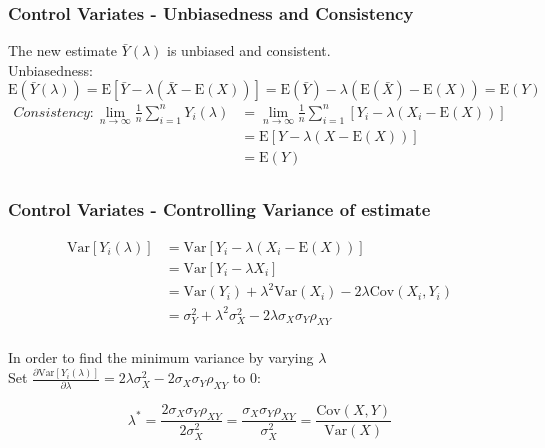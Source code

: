\documentclass{beamer}
\begin{document}
\begin{frame}
\frametitle{Control Variates - Unbiasedness and Consistency}
The new estimate $\bar{Y}(\lambda)$ is unbiased and consistent.\\[5mm]
Unbiasedness: $$\mathrm{E}(\bar{Y}(\lambda)) = \mathrm{E}[\bar{Y} - \lambda(\bar{X} - \mathrm{E}(X))] = \mathrm{E}(\bar{Y}) - \lambda(\mathrm{E}(\bar{X}) - \mathrm{E}(X)) = \mathrm{E}(Y) $$
\begin{equation*}
\begin{split}
Consistency: \lim_{n\to\infty} \frac{1}{n}\sum_{i=1}^{n} Y_{i}(\lambda) 
&=\lim_{n\to\infty} \frac{1}{n}\sum_{i=1}^{n} [Y_{i} - \lambda (X_{i} - \mathrm{E}(X))] \\
&= \mathrm{E}[Y - \lambda(X-\mathrm{E}(X))] \\
&= \mathrm{E}(Y) \\
\end{split}
\end{equation*}
\end{frame}

\begin{frame}
\frametitle{Control Variates - Controlling Variance of estimate}
\begin{equation*}
\begin{split}
\mathrm{Var}[Y_{i}(\lambda)]
&=\mathrm{Var} [Y_{i} - \lambda(X_{i} - \mathrm{E}(X))] \\
&= \mathrm{Var}[Y_{i} - \lambda X_{i}] \\
&= \mathrm{Var}(Y_{i}) + \lambda^{2}\mathrm{Var}(X_{i}) - 2\lambda\mathrm{Cov}(X_{i}, Y_{i}) \\
&= \sigma_{Y}^{2} + \lambda^{2}\sigma_{X}^{2}-2\lambda\sigma_{X}\sigma_{Y}\rho_{XY}\\
\end{split}
\end{equation*}
\begin{center}
In order to find the minimum variance by varying $\lambda$\\[2mm]
Set $\frac{\partial \mathrm{Var}[Y_{i}(\lambda)]}{\partial \lambda} = 2\lambda \sigma_{X}^{2} - 2\sigma_{X}\sigma_{Y}\rho_{XY}$ to 0:
\end{center}
$$ \lambda^{*} = \frac{2\sigma_{X}\sigma_{Y}\rho_{XY}}{2\sigma_{X}^{2}} = \frac{\sigma_{X}\sigma_{Y}\rho_{XY}}{\sigma_{X}^{2}} = \frac{\mathrm{Cov}(X,Y)}{\mathrm{Var}(X)}$$
\end{frame}
\end{document}
